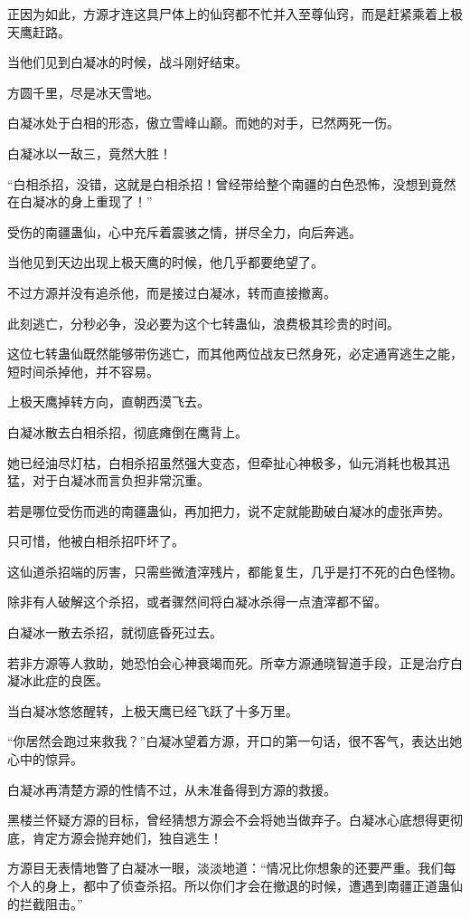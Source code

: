 \begin{this_body}
正因为如此，方源才连这具尸体上的仙窍都不忙并入至尊仙窍，而是赶紧乘着上极天鹰赶路。

当他们见到白凝冰的时候，战斗刚好结束。

方圆千里，尽是冰天雪地。

白凝冰处于白相的形态，傲立雪峰山巅。而她的对手，已然两死一伤。

白凝冰以一敌三，竟然大胜！

“白相杀招，没错，这就是白相杀招！曾经带给整个南疆的白色恐怖，没想到竟然在白凝冰的身上重现了！”

受伤的南疆蛊仙，心中充斥着震骇之情，拼尽全力，向后奔逃。

当他见到天边出现上极天鹰的时候，他几乎都要绝望了。

不过方源并没有追杀他，而是接过白凝冰，转而直接撤离。

此刻逃亡，分秒必争，没必要为这个七转蛊仙，浪费极其珍贵的时间。

这位七转蛊仙既然能够带伤逃亡，而其他两位战友已然身死，必定通宵逃生之能，短时间杀掉他，并不容易。

上极天鹰掉转方向，直朝西漠飞去。

白凝冰散去白相杀招，彻底瘫倒在鹰背上。

她已经油尽灯枯，白相杀招虽然强大变态，但牵扯心神极多，仙元消耗也极其迅猛，对于白凝冰而言负担非常沉重。

若是哪位受伤而逃的南疆蛊仙，再加把力，说不定就能勘破白凝冰的虚张声势。

只可惜，他被白相杀招吓坏了。

这仙道杀招端的厉害，只需些微渣滓残片，都能复生，几乎是打不死的白色怪物。

除非有人破解这个杀招，或者骤然间将白凝冰杀得一点渣滓都不留。

白凝冰一散去杀招，就彻底昏死过去。

若非方源等人救助，她恐怕会心神衰竭而死。所幸方源通晓智道手段，正是治疗白凝冰此症的良医。

当白凝冰悠悠醒转，上极天鹰已经飞跃了十多万里。

“你居然会跑过来救我？”白凝冰望着方源，开口的第一句话，很不客气，表达出她心中的惊异。

白凝冰再清楚方源的性情不过，从未准备得到方源的救援。

黑楼兰怀疑方源的目标，曾经猜想方源会不会将她当做弃子。白凝冰心底想得更彻底，肯定方源会抛弃她们，独自逃生！

方源目无表情地瞥了白凝冰一眼，淡淡地道：“情况比你想象的还要严重。我们每个人的身上，都中了侦查杀招。所以你们才会在撤退的时候，遭遇到南疆正道蛊仙的拦截阻击。”


\end{this_body}
